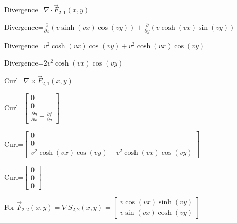 \documentclass[12pt, executivepaper]{article}
\begin{document}
\begin{flushleft}
\vspace{3mm}

Divergence=$\nabla \cdot \vec F_{2,1}(x,y)$ \\

\vspace{3mm}

Divergence=$\frac{\partial}{\partial x}(v\sinh(vx)\cos(vy))+\frac{\partial}{\partial y}(v\cosh(vx)\sin(vy))$ \\

\vspace{3mm}

Divergence=$v^2\cosh(vx)\cos(vy)+v^2\cosh(vx)\cos(vy)$ \\

\vspace{3mm}

Divergence=$2v^2\cosh(vx)\cos(vy)$ \\

\vspace{3mm}

Curl=$\nabla \times \vec F_{2,1}(x,y)$ \\

\vspace{3mm}

Curl=$\begin{bmatrix}
0 \\
0 \\
\frac{\partial g}{\partial x}-\frac{\partial f}{\partial y}
\end{bmatrix}$ \\

\vspace{3mm}

Curl=$\begin{bmatrix}
0 \\
0 \\
v^2\cosh(vx)\cos(vy)-v^2\cosh(vx)\cos(vy)
\end{bmatrix}$ \\

\vspace{3mm}

Curl=$\begin{bmatrix}
0 \\
0 \\
0
\end{bmatrix}$ \\

\vspace{5mm}

For $\vec F_{2,2}(x,y)=\nabla S_{2,2}(x,y)=
\begin{bmatrix}
v\cos(vx)\sinh(vy) \\
v\sin(vx)\cosh(vy)
\end{bmatrix}$


\end{flushleft}
\end{document}
